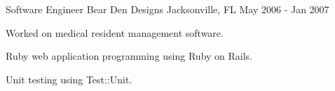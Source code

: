 \begin{cventries}
  \cventry
    {Software Engineer} %
    {Bear Den Designs} %
    {Jacksonville, FL} %
    {May 2006 - Jan 2007} %
    {
      \begin{cvitems} %
        \item {Worked on medical resident management software.}
        \item {Ruby web application programming using Ruby on Rails.}
        \item {Unit testing using Test::Unit.}
      \end{cvitems}
    }

\end{cventries}
